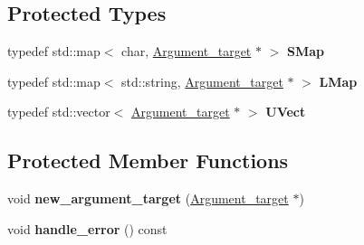 \subsection*{Protected Types}
\begin{DoxyCompactItemize}
\item 
\hypertarget{classdsr_1_1_argument__helper_abfe74556684f48bec2d9c468da63264e}{
typedef std::map$<$ char, \hyperlink{classdsr_1_1_argument__helper_1_1_argument__target}{Argument\_\-target} $\ast$ $>$ {\bfseries SMap}}
\label{classdsr_1_1_argument__helper_abfe74556684f48bec2d9c468da63264e}

\item 
\hypertarget{classdsr_1_1_argument__helper_a2bc3ed2bc9167b4a94f277c5dcc8cc09}{
typedef std::map$<$ std::string, \hyperlink{classdsr_1_1_argument__helper_1_1_argument__target}{Argument\_\-target} $\ast$ $>$ {\bfseries LMap}}
\label{classdsr_1_1_argument__helper_a2bc3ed2bc9167b4a94f277c5dcc8cc09}

\item 
\hypertarget{classdsr_1_1_argument__helper_a5f432d153ddf902ab8921952b79ffb97}{
typedef std::vector$<$ \hyperlink{classdsr_1_1_argument__helper_1_1_argument__target}{Argument\_\-target} $\ast$ $>$ {\bfseries UVect}}
\label{classdsr_1_1_argument__helper_a5f432d153ddf902ab8921952b79ffb97}

\end{DoxyCompactItemize}
\subsection*{Protected Member Functions}
\begin{DoxyCompactItemize}
\item 
\hypertarget{classdsr_1_1_argument__helper_acd96badb442972d84d7c186e6a182c85}{
void {\bfseries new\_\-argument\_\-target} (\hyperlink{classdsr_1_1_argument__helper_1_1_argument__target}{Argument\_\-target} $\ast$)}
\label{classdsr_1_1_argument__helper_acd96badb442972d84d7c186e6a182c85}

\item 
\hypertarget{classdsr_1_1_argument__helper_a92587f095f227e4384a459af62a3e431}{
void {\bfseries handle\_\-error} () const }
\label{classdsr_1_1_argument__helper_a92587f095f227e4384a459af62a3e431}

\end{DoxyCompactItemize}

